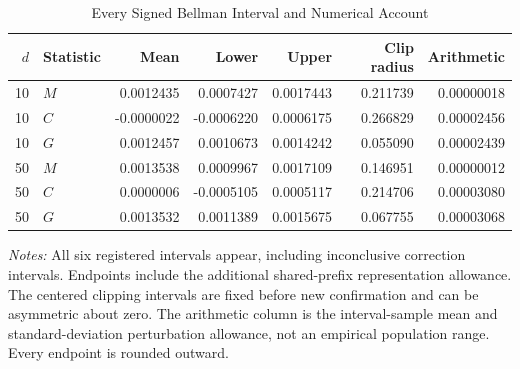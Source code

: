 \begin{table}[!htbp]
\centering
\footnotesize
\caption{Every Signed Bellman Interval and Numerical Account}\label{tab:r16signedfull}
\begin{tabular}{rlrrrrr}
\toprule
$d$ & Statistic & Mean & Lower & Upper & Clip radius & Arithmetic \\
\midrule
10 & $M$ & 0.0012435 & 0.0007427 & 0.0017443 & 0.211739 & 0.00000018 \\
10 & $C$ & -0.0000022 & -0.0006220 & 0.0006175 & 0.266829 & 0.00002456 \\
10 & $G$ & 0.0012457 & 0.0010673 & 0.0014242 & 0.055090 & 0.00002439 \\
50 & $M$ & 0.0013538 & 0.0009967 & 0.0017109 & 0.146951 & 0.00000012 \\
50 & $C$ & 0.0000006 & -0.0005105 & 0.0005117 & 0.214706 & 0.00003080 \\
50 & $G$ & 0.0013532 & 0.0011389 & 0.0015675 & 0.067755 & 0.00003068 \\
\bottomrule
\end{tabular}
\begin{minipage}{0.97\linewidth}\footnotesize
\emph{Notes:} All six registered intervals appear, including inconclusive correction intervals. Endpoints include the additional shared-prefix representation allowance. The centered clipping intervals are fixed before new confirmation and can be asymmetric about zero. The arithmetic column is the interval-sample mean and standard-deviation perturbation allowance, not an empirical population range. Every endpoint is rounded outward.
\end{minipage}
\end{table}
